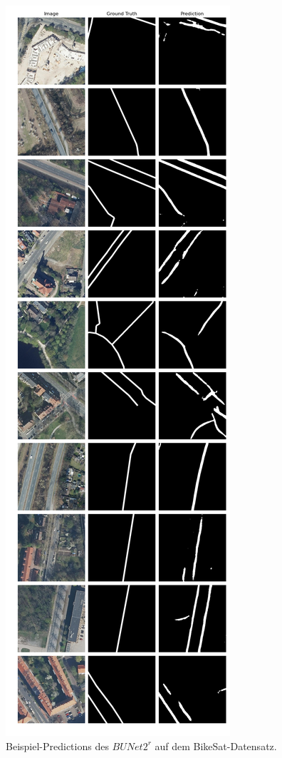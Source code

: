 \begin{figure}
	\centering
	\includegraphics[width=.41\textwidth]{Bilder/Samples-BikeSat/bunet2-r.png} 
	\caption{Beispiel-Predictions des $BUNet2^r$ auf dem BikeSat-Datensatz.}
	\label{fig:bikesat-samples-bunet2-r}
\end{figure}

